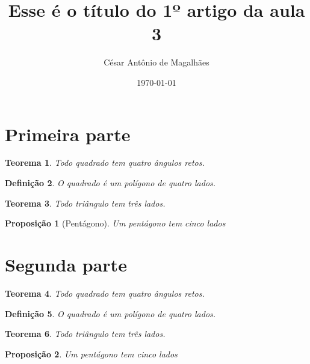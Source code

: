 \documentclass[12pt, a4paper]{article}
\title{Esse é o título do 1º artigo da aula 3}
\author{César Antônio de Magalhães}
\date{\today}
\newtheorem{teorema}{Teorema}[section]
\newtheorem{definicao}[teorema]{Definição}
\newtheorem{proposicao}{Proposição}[section]
\begin{document}
	
	\section{Primeira parte}
	\begin{teorema}
		Todo quadrado tem quatro ângulos retos.
	\end{teorema}
	
	\begin{definicao}
		O quadrado é um polígono de quatro lados.
	\end{definicao}
		
	\begin{teorema}
		Todo triângulo tem três lados.
	\end{teorema}
	
	\begin{proposicao}[Pentágono]
		Um pentágono tem cinco lados 
	\end{proposicao}
	
	\section{Segunda parte}
	
	\begin{teorema}
		Todo quadrado tem quatro ângulos retos.
	\end{teorema}
	
	\begin{definicao}
		O quadrado é um polígono de quatro lados.
	\end{definicao}
	
	\begin{teorema}
		Todo triângulo tem três lados.
	\end{teorema}
	
	\begin{proposicao}
		Um pentágono tem cinco lados 
	\end{proposicao}
\end{document}
